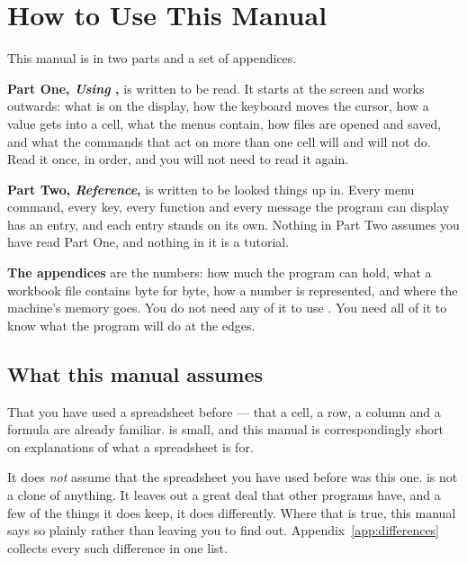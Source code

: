 \chapter*{How to Use This Manual}

This manual is in two parts and a set of appendices.

\textbf{Part One, \emph{Using \ccprod},} is written to be read. It starts at
the screen and works outwards: what is on the display, how the keyboard moves
the cursor, how a value gets into a cell, what the menus contain, how files are
opened and saved, and what the commands that act on more than one cell will and
will not do. Read it once, in order, and you will not need to read it again.

\textbf{Part Two, \emph{Reference},} is written to be looked things up in.
Every menu command, every key, every function and every message the program can
display has an entry, and each entry stands on its own. Nothing in Part Two
assumes you have read Part One, and nothing in it is a tutorial.

\textbf{The appendices} are the numbers: how much the program can hold, what a
workbook file contains byte for byte, how a number is represented, and where
the machine's memory goes. You do not need any of it to use \ccprod. You need
all of it to know what the program will do at the edges.

\section*{What this manual assumes}

That you have used a spreadsheet before --- that a cell, a row, a column and a
formula are already familiar. \ccprod{} is small, and this manual is
correspondingly short on explanations of what a spreadsheet is for.

It does \emph{not} assume that the spreadsheet you have used before was this
one. \ccprod{} is not a clone of anything. It leaves out a great deal that
other programs have, and a few of the things it does keep, it does differently.
Where that is true, this manual says so plainly rather than leaving you to find
out. Appendix~\ref{app:differences} collects every such difference in one list.

